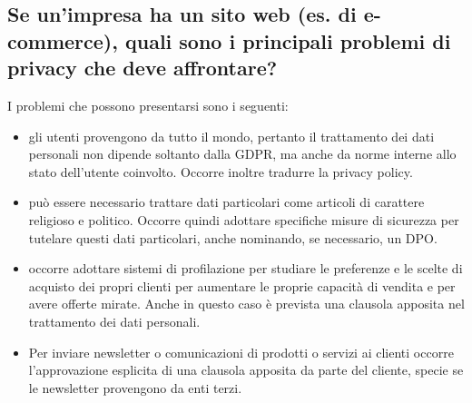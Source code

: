 \subsection{Se un’impresa ha un sito web (es. di e-commerce), quali sono i principali problemi di privacy
che deve affrontare?}

I problemi che possono presentarsi sono i seguenti:
\begin{itemize}
    \item gli utenti provengono da tutto il mondo, pertanto il trattamento dei dati personali non dipende soltanto dalla GDPR, ma anche da norme interne allo stato dell'utente coinvolto. Occorre inoltre tradurre la privacy policy.
    \item può essere necessario trattare dati particolari come articoli di carattere religioso e politico.
    Occorre quindi adottare specifiche misure di sicurezza per tutelare questi dati particolari, anche nominando, se necessario, un DPO.
    \item occorre adottare sistemi di profilazione per studiare le preferenze e le scelte di acquisto dei propri clienti per aumentare le proprie capacità di vendita e per avere offerte mirate. Anche in questo caso è prevista una clausola apposita nel trattamento dei dati personali.
    \item Per inviare newsletter o comunicazioni di prodotti o servizi ai clienti occorre l'approvazione esplicita di una clausola apposita da parte del cliente, specie se le newsletter provengono da enti terzi.

\end{itemize}
